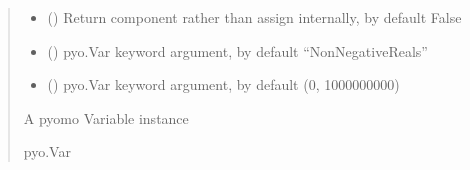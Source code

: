 \documentclass[letterpaper,10pt,english]{sphinxmanual}
\begin{document}
\begin{fulllineitems}
\begin{fulllineitems}
\begin{quote}
\begin{description}
\begin{itemize}
\item {} 
\sphinxAtStartPar
{} (\sphinxstyleliteralemphasis{\sphinxupquote{ | }}\sphinxstyleliteralemphasis{\sphinxupquote{, }}) \textendash{} Return component rather than assign internally, by default False

\item {} 
\sphinxAtStartPar
{} (\sphinxstyleliteralemphasis{\sphinxupquote{ {[}}}\sphinxstyleliteralemphasis{\sphinxupquote{, }}\sphinxstyleliteralemphasis{\sphinxupquote{, }}\sphinxstyleliteralemphasis{\sphinxupquote{, }}\sphinxstyleliteralemphasis{\sphinxupquote{{]} }}\sphinxstyleliteralemphasis{\sphinxupquote{| }}\sphinxstyleliteralemphasis{\sphinxupquote{, }}) \textendash{} pyo.Var keyword argument, by default “NonNegativeReals”

\item {} 
\sphinxAtStartPar
{} (\sphinxstyleliteralemphasis{\sphinxupquote{ | }}\sphinxstyleliteralemphasis{\sphinxupquote{, }}) \textendash{} pyo.Var keyword argument, by default (0, 1000000000)

\end{itemize}

\sphinxAtStartPar
A pyomo Variable instance

\sphinxAtStartPar
pyo.Var

\end{description}\end{quote}

\end{fulllineitems}



\end{fulllineitems}
\end{document}
